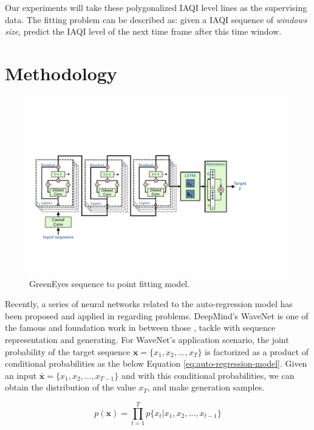 \documentclass[sigconf]{acmart}
\begin{document}
Our experiments will take these polygonalized IAQI level lines as the supervising data. The fitting problem can be described as: given a IAQI sequence of \textit{windows size}, predict the IAQI level of the next time frame after this time window.


\section{Methodology}\label{sec:model_design}

\begin{figure}[!htbp]
  \centering
  \includegraphics[width=0.8\linewidth]{fig/model/WaveNet_LSTM_ver0.1.pdf}
  \caption{GreenEyes sequence to point fitting model.}
  \label{fig:greeneyes_model}
\end{figure}

Recently, a series of neural networks related to the auto-regression model has been proposed and applied in regarding problems. DeepMind's WaveNet \cite{oord2016wavenet} is one of the famous and foundation work in between those \cite{shen2018natural}, \cite{wang2017tacotron} tackle with sequence representation and generating. For WaveNet's application scenario, the joint probability of the target sequence $\textbf{x}=\{x_1,x_2,...,x_T\}$ is factorized as a product of conditional probabilities as the below Equation \ref{eq:auto-regression-model}. Given an input $\bar{\textbf{x}}=\{x_1,x_2,...,x_{T-1}\}$ and with this conditional probabilities, we can obtain the distribution of the value $x_T$, and make generation samples.

\begin{equation}
    p(\textbf{x})=\prod_{t=1}^Tp\{x_t|x_1,x_2,...,x_{t-1}\}
    \label{eq:auto-regression-model}
\end{equation}
\end{document}
